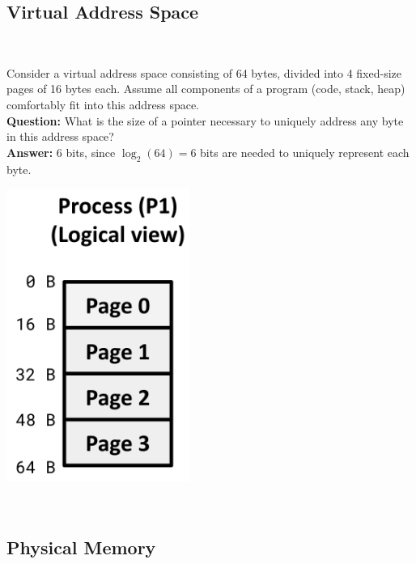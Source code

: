 \subsection{Virtual Address Space}
\begin{example}
\leavevmode\\
\noindent
\begin{minipage}{0.55\textwidth}
  Consider a virtual address space consisting of 64 bytes, divided into 4 fixed-size pages of 16 bytes each. Assume all components of a program (code, stack, heap) comfortably fit into this address space.\\[5px]
\textbf{Question:} What is the size of a pointer necessary to uniquely address any byte in this address space?\\
\textbf{Answer:} 6 bits, since $\log_2(64) = 6$ bits are needed to uniquely represent each byte.
\end{minipage}%
\hfill
\vline
\hfill
\begin{minipage}{0.35\textwidth}
\begin{center}
  \includegraphics[width=0.45\textwidth]{chapters/L5/images/question.png}
\end{center}
\end{minipage}\\
\end{example}

\subsection{Physical Memory}

